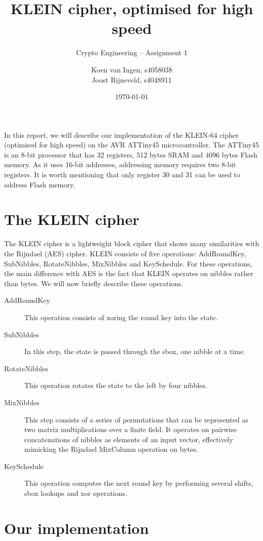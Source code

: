 \documentclass[a4paper]{article}
\title{KLEIN cipher, optimised for high speed}
\subtitle{Crypto Engineering -- Assignment 1}
\date{\monthdate\today}
\author{Koen van Ingen, s4058038\\
Joost Rijneveld, s4048911}
\begin{document}
\maketitle

In this report, we will describe our implementation of the KLEIN-64 cipher \cite{KLEIN} (optimised for high speed) on the AVR ATTiny45 microcontroller. The ATTiny45 is an 8-bit processor that has 32 registers, 512 bytes SRAM and 4096 bytes Flash memory. As it uses 16-bit addresses, addressing memory requires two 8-bit registers. It is worth mentioning that only register 30 and 31 can be used to address Flash memory.

\section{The KLEIN cipher}

The KLEIN cipher is a lightweight block cipher that shows many similarities with the Rijndael (AES) cipher. KLEIN consists of five operations: AddRoundKey, SubNibbles, RotateNibbles, MixNibbles and KeySchedule. For these operations, the main difference with AES is the fact that KLEIN operates on nibbles rather than bytes. We will now briefly describe these operations. 

\begin{description}
	\item[AddRoundKey] This operation consists of xoring the round key into the state.
	\item[SubNibbles] In this step, the state is passed through the sbox, one nibble at a time.
	\item[RotateNibbles] This operation rotates the state to the left by four nibbles.
	\item[MixNibbles] This step consists of a series of permutations that can be represented as two matrix multiplications over a finite field. It operates on pairwise concatenations of nibbles as elements of an input vector, effectively mimicking the Rijndael MixColumn operation on bytes.
	\item[KeySchedule] This operation computes the next round key by performing several shifts, sbox lookups and xor operations.
\end{description}

\section{Our implementation}
\end{document}
